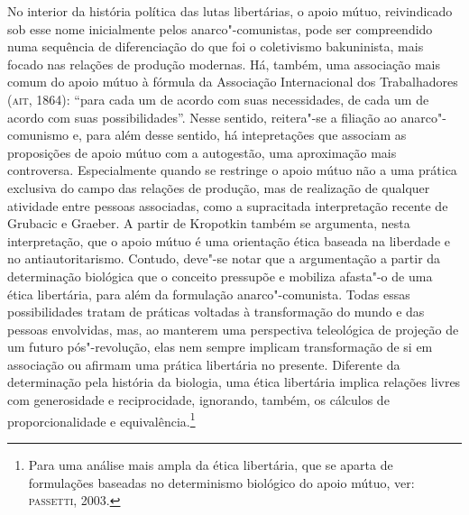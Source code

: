 No interior da história política das lutas libertárias, o apoio mútuo,
reivindicado sob esse nome inicialmente pelos anarco"-comunistas, pode
ser compreendido numa sequência de diferenciação do que foi o
coletivismo bakuninista, mais focado nas relações de produção modernas.
Há, também, uma associação mais comum do apoio mútuo à fórmula da
Associação Internacional dos Trabalhadores (\textsc{ait}, 1864): ``para cada um
de acordo com suas necessidades, de cada um de acordo com suas
possibilidades''. Nesse sentido, reitera"-se a filiação ao
anarco"-comunismo e, para além desse sentido, há intepretações que
associam as proposições de apoio mútuo com a autogestão, uma aproximação
mais controversa. Especialmente quando se restringe o apoio mútuo não a
uma prática exclusiva do campo das relações de produção, mas de
realização de qualquer atividade entre pessoas associadas, como a
supracitada interpretação recente de Grubacic e Graeber. A partir de
Kropotkin também se argumenta, nesta interpretação, que o apoio mútuo é
uma orientação ética baseada na liberdade e no antiautoritarismo.
Contudo, deve"-se notar que a argumentação a partir da determinação
biológica que o conceito pressupõe e mobiliza afasta"-o de uma ética
libertária, para além da formulação anarco"-comunista. Todas essas
possibilidades tratam de práticas voltadas à transformação do mundo e
das pessoas envolvidas, mas, ao manterem uma perspectiva teleológica de
projeção de um futuro pós"-revolução, elas nem sempre implicam
transformação de si em associação ou afirmam uma prática libertária no
presente. Diferente da determinação pela história da biologia, uma ética
libertária implica relações livres com generosidade e reciprocidade,
ignorando, também, os cálculos de proporcionalidade e
equivalência.\footnote{Para uma análise mais ampla da ética libertária,
  que se aparta de formulações baseadas no determinismo biológico do
  apoio mútuo, ver: \textsc{passetti}, 2003.}

